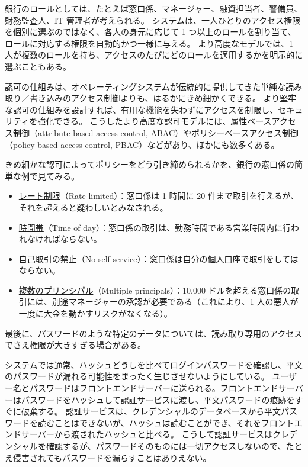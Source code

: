 \documentclass[uplatex]{jsarticle}
\def\label#1{}%
\begin{document}
\begin{exa}[銀行のロール]\label{exa:ch1-bank-roles}
銀行のロールとしては、たとえば窓口係、マネージャー、融資担当者、警備員、財務監査人、IT 管理者が考えられる。
システムは、一人ひとりのアクセス権限を個別に選ぶのではなく、各人の身元に応じて 1 つ以上のロールを割り当て、ロールに対応する権限を自動的かつ一様に与える。
より高度なモデルでは、1 人が複数のロールを持ち、アクセスのたびにどのロールを適用するかを明示的に選ぶこともある。
\end{exa}

認可の仕組みは、オペレーティングシステムが伝統的に提供してきた単純な読み取り／書き込みのアクセス制御よりも、はるかにきめ細かくできる。
より堅牢な認可の仕組みを設計すれば、有用な機能を失わずにアクセスを制限し、セキュリティを強化できる。
こうしたより高度な認可モデルには、\underline{属性ベースアクセス制御}（attribute-based access control, ABAC）や\underline{ポリシーベースアクセス制御}（policy-based access control, PBAC）などがあり、ほかにも数多くある。

\begin{exa}[銀行の窓口係のきめ細かな認可]\label{exa:ch1-bank-teller}
きめ細かな認可によってポリシーをどう引き締められるかを、銀行の窓口係の簡単な例で見てみる。
\begin{itemize}
\item \underline{レート制限}（Rate-limited）：窓口係は 1 時間に 20 件まで取引を行えるが、それを超えると疑わしいとみなされる。
\item \underline{時間帯}（Time of day）：窓口係の取引は、勤務時間である営業時間内に行われなければならない。
\item \underline{自己取引の禁止}（No self-service）：窓口係は自分の個人口座で取引をしてはならない。
\item \underline{複数のプリンシパル}（Multiple principals）：10,000 ドルを超える窓口係の取引には、別途マネージャーの承認が必要である（これにより、1 人の悪人が一度に大金を動かすリスクがなくなる）。
\end{itemize}
\end{exa}

最後に、パスワードのような特定のデータについては、読み取り専用のアクセスでさえ権限が大きすぎる場合がある。

\begin{exa}[ハッシュによるパスワードの照合]\label{exa:ch1-password-hash-check}
システムでは通常、ハッシュどうしを比べてログインパスワードを確認し、平文のパスワードが漏れる可能性をまったく生じさせないようにしている。
ユーザー名とパスワードはフロントエンドサーバーに送られる。フロントエンドサーバーはパスワードをハッシュして認証サービスに渡し、平文パスワードの痕跡をすぐに破棄する。
認証サービスは、クレデンシャルのデータベースから平文パスワードを読むことはできないが、ハッシュは読むことができ、それをフロントエンドサーバーから渡されたハッシュと比べる。
こうして認証サービスはクレデンシャルを確認するが、パスワードそのものには一切アクセスしないので、たとえ侵害されてもパスワードを漏らすことはありえない。
\end{exa}
\end{document}
